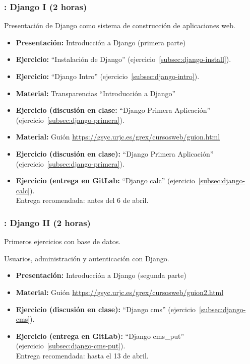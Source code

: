 \documentclass[a4paper,12pt]{article}
\begin{document}
\subsubsection{\juevesG: Django I (2 horas)}
\label{cal:juevesG}

Presentación de Django como sistema de construcción de aplicaciones web.

\begin{itemize}
 \item \textbf{Presentación:} Introducción a Django (primera parte)
 \item \textbf{Ejercicio:} ``Instalación de Django'' (ejercicio~\ref{subsec:django-install}).
 \item \textbf{Ejercicio:} ``Django Intro'' (ejercicio~\ref{subsec:django-intro}).
 \item \textbf{Material:} Transparencias ``Introducción a Django''
 \item \textbf{Ejercicio (discusión en clase:} ``Django Primera Aplicación'' (ejercicio~\ref{subsec:django-primera}).
 \item \textbf{Material:} Guión \url{https://gsyc.urjc.es/grex/cursosweb/guion.html}
 \item \textbf{Ejercicio (discusión en clase):} ``Django Primera Aplicación'' (ejercicio~\ref{subsec:django-primera}).

  \item \textbf{Ejercicio (entrega en GitLab:} ``Django calc'' (ejercicio~\ref{subsec:django-calc}). \\
    Entrega recomendada: antes del 6 de abril.
\end{itemize}


\subsubsection{\martesI: Django II (2 horas)}
\label{cal:martesI}

Primeros ejercicios con base de datos.

Usuarios, administración y autenticación con Django.

\begin{itemize}
 \item \textbf{Presentación:} Introducción a Django (segunda parte)
  \item \textbf{Material:} Guión \url{https://gsyc.urjc.es/grex/cursosweb/guion2.html}
 \item \textbf{Ejercicio  (discusión en clase):} ``Django cms'' (ejercicio~\ref{subsec:django-cms}). \\
 \item \textbf{Ejercicio (entrega en GitLab):} ``Django cms\_put'' (ejercicio~\ref{subsec:django-cms-put}). \\
  Entrega recomendada: hasta el 13 de abril.
\end{itemize}
\end{document}
